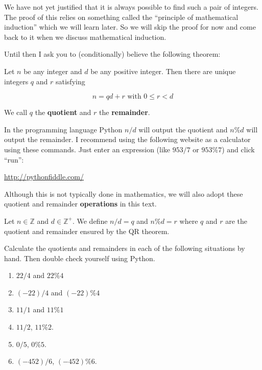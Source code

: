 We have not yet justified that it is always possible to find such a pair of integers.  The proof of this relies on something called the ``principle of mathematical induction'' which we will learn later.  So we will skip the proof for now and come back to it when we discuss mathematical induction.

Until then I ask you to (conditionally) believe the following theorem:

\begin{theorem}
Let $n$ be any integer and $d$ be any positive integer. Then there are unique integers $q$ and $r$ satisfying

\[
n = qd + r \textrm{ with  $0 \leq r < d$}
\]

We call $q$ the  \textbf{quotient} and $r$ the  \textbf{remainder}.
\end{theorem}

In the programming language Python  $n/d$ will output the quotient and $n\% d$ will output the remainder.  I recommend using the following website as a calculator using these commands.  Just enter an expression (like $953/7$ or $953 \% 7$) and click ``run'':

\begin{center}
\url{http://pythonfiddle.com/}
\end{center}

Although this is not typically done in mathematics, we will also adopt these quotient and remainder \textbf{operations} in this text.

\begin{definition}
		Let $n \in \mathbb{Z}$ and $d \in \mathbb{Z}^+$.  We define $n/d  = q$ and $n \% d = r$ where $q$ and $r$ are the quotient and remainder ensured by the QR theorem.
	\end{definition}

\begin{xca}
	Calculate the quotients and remainders in each of the following situations by hand.  Then double check yourself using Python.
	\begin{enumerate}
			\item $22/4$ and $22\%4$
			\item $(-22)/4$ and $(-22)\% 4$
			\item $11/1$ and $11\%1$
			\item $11/2$, $11\%2$.
			\item $0/5$, $0\%5$.
			\item $(-452)/6$, $(-452) \% 6$.
		\end{enumerate}
	\end{xca}

